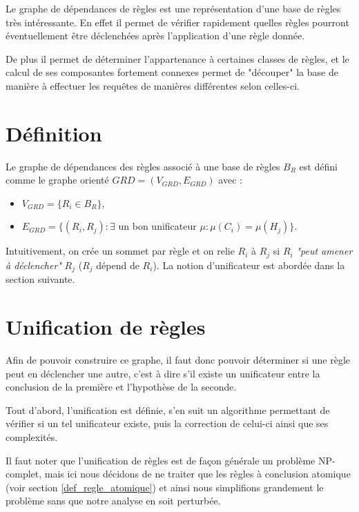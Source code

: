 
Le graphe de dépendances de règles est une représentation d'une base de règles très
intéressante. En effet il permet de vérifier rapidement quelles règles pourront
éventuellement être déclenchées après l'application d'une règle donnée.

De plus il permet de déterminer l'appartenance à certaines classes de règles, et le
calcul de ses composantes fortement connexes permet de "découper" la base de manière à 
effectuer les requêtes de manières différentes selon celles-ci. 


\section{Définition}\label{grd_def}
Le graphe de dépendances des règles associé à une base de règles $B_R$ est défini comme le 
graphe orienté $GRD = (V_{GRD},E_{GRD})$ avec :
\begin{itemize}
	\item $V_{GRD} = \{R_i \in B_R\}$,
	\item $E_{GRD} = \{(R_i,R_j) : \exists$ un bon unificateur $\mu : \mu(C_i) =
	\mu(H_j)\}$.\\ 
\end{itemize}
\par{}
Intuitivement, on crée un sommet par règle et on relie $R_i$ à $R_j$ si $R_i$ {\em "peut
amener à déclencher"} $R_j$ ($R_j$ dépend de $R_i$).
La notion d'unificateur est abordée dans la section suivante.

\section{Unification de règles}\label{grd_unif}

Afin de pouvoir construire ce graphe, il faut donc pouvoir déterminer si une règle peut
en déclencher une autre, c'est à dire s'il existe un unificateur entre la conclusion de
la première et l'hypothèse de la seconde.

Tout d'abord, l'unification est définie, s'en suit un algorithme permettant de vérifier
si un tel unificateur existe, puis la correction de celui-ci ainsi que ses complexités. 

Il faut noter que l'unification de règles est de façon générale un problème NP-complet,
mais ici nous
décidons de ne traiter que les règles à conclusion atomique 
(voir section \ref{def_regle_atomique}) et ainsi nous simplifions grandement le problème
sans que notre analyse en soit perturbée.

